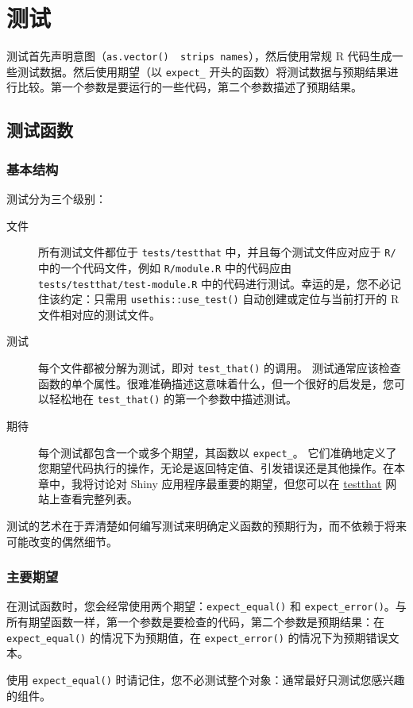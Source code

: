 \chapter{测试\label{ch21}}
测试首先声明意图（\verb|as.vector()  strips names|），然后使用常规 R 代码生成一些测试数据。然后使用期望（以 \verb|expect_| 开头的函数）将测试数据与预期结果进行比较。第一个参数是要运行的一些代码，第二个参数描述了预期结果。

\section{测试函数}
\subsection{基本结构}
测试分为三个级别：
\begin{description}
    \item[文件] 所有测试文件都位于 \verb|tests/testthat| 中，并且每个测试文件应对应于 \verb|R/| 中的一个代码文件，例如 \verb|R/module.R| 中的代码应由 \verb|tests/testthat/test-module.R| 中的代码进行测试。幸运的是，您不必记住该约定：只需用 \verb|usethis::use_test()| 自动创建或定位与当前打开的 R 文件相对应的测试文件。
    \item[测试] 每个文件都被分解为测试，即对 \verb|test_that()| 的调用。 测试通常应该检查函数的单个属性。很难准确描述这意味着什么，但一个很好的启发是，您可以轻松地在 \verb|test_that()| 的第一个参数中描述测试。
    \item[期待] 每个测试都包含一个或多个期望，其函数以 \verb|expect_|。 它们准确地定义了您期望代码执行的操作，无论是返回特定值、引发错误还是其他操作。在本章中，我将讨论对 Shiny 应用程序最重要的期望，但您可以在 \href{https://testthat.r-lib.org/reference/index.html#section-expectations}{testthat} 网站上查看完整列表。
\end{description}

测试的艺术在于弄清楚如何编写测试来明确定义函数的预期行为，而不依赖于将来可能改变的偶然细节。
\subsection{主要期望}
在测试函数时，您会经常使用两个期望：\verb|expect_equal()| 和 \verb|expect_error()|。与所有期望函数一样，第一个参数是要检查的代码，第二个参数是预期结果：在 \verb|expect_equal()| 的情况下为预期值，在 \verb|expect_error()| 的情况下为预期错误文本。

使用 \verb|expect_equal()| 时请记住，您不必测试整个对象：通常最好只测试您感兴趣的组件。

